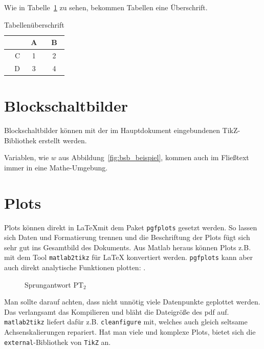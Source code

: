 Wie in Tabelle~\ref{tab:tabelle} zu sehen, bekommen Tabellen eine Überschrift.
%
\begin{table}
	\centering
	\caption{Tabellenüberschrift}	
	\begin{tabular}{r|cc}
		& A & B \\
		\hline
		C & 1 & 2 \\
		D & 3 & 4 \\
	\end{tabular}
	\label{tab:tabelle}
\end{table}
%

\section{Blockschaltbilder}
Blockschaltbilder können mit der im Hauptdokument eingebundenen TikZ-Bibliothek erstellt werden.
%
\begin{center} %
	
	\label{fig:bsb_beispiel}
\end{center}

Variablen, wie $w$ aus Abbildung~\ref{fig:bsb_beispiel}, kommen auch im Fließtext immer in eine Mathe-Umgebung.

\section{Plots}
Plots können direkt in \LaTeX mit dem Paket \texttt{pgfplots} gesetzt werden.
So lassen sich Daten und Formatierung trennen und die Beschriftung der Plots fügt sich sehr gut ins Gesamtbild des Dokuments.
Aus Matlab heraus können Plots z.B. mit dem Tool \texttt{matlab2tikz} für \LaTeX{} konvertiert werden.
\texttt{pgfplots} kann aber auch direkt analytische Funktionen plotten: 
.

\begin{figure}
	\centering
	
	\caption{Sprungantwort $\mathrm{PT}_2$}
	\label{fig:step_pt2}
\end{figure}

Man sollte darauf achten, dass nicht unnötig viele Datenpunkte geplottet werden. Das verlangsamt das Kompilieren und bläht die Dateigröße des pdf auf.
\texttt{matlab2tikz} liefert dafür z.B. \texttt{cleanfigure} mit, welches auch gleich seltsame Achsenskalierungen repariert.
Hat man viele und komplexe Plots, bietet sich die \texttt{external}-Bibliothek von \texttt{TikZ} an.

